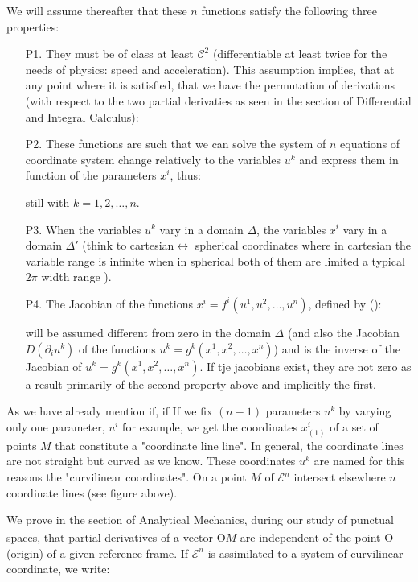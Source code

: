 	We will assume thereafter that these $n$ functions satisfy the following three properties:
	\begin{itemize}
		\item[P1.] They must be of class at least $\mathcal{C}^2$ (differentiable at least twice for the needs of physics: speed and acceleration). This assumption implies, that at any point where it is satisfied, that we have the permutation of derivations (with respect to the two partial derivaties as seen in the section of Differential and Integral Calculus):
		

		\item[P2.] These functions are such that we can solve the system of $n$ equations of coordinate system change relatively to the variables $u^k$ and express them in function of the parameters $x^i$, thus:
		
		still with $k=1,2, \ldots,n$.

		\item[P3.] When the variables $u^k$ vary in a domain $\Delta$, the variables $x^i$ vary in a domain $\Delta'$ (think to cartesian$\leftrightarrow$ spherical coordinates where in cartesian the variable range is infinite when in spherical both of them are limited a typical $2\pi$ width range ). 

		\item[P4.] The Jacobian of the functions $x^i=f^i(u^1,u^2,\ldots,u^n)$, defined by ():
		
		will be assumed different from zero in the domain $\Delta$ (and also the Jacobian $D(\partial_i u^k)$ of the functions $u^k=g^k(x^1,x^2,\ldots,x^n)$) and is the inverse of the Jacobian of $u^k=g^k(x^1,x^2,\ldots,x^n)$. If tje jacobians exist, they are not zero as a result primarily of the second property above and implicitly the first.
	\end{itemize}
	As we have already mention if, if If we fix $(n-1)$ parameters $u^k$ by varying only one parameter, $u^i$ for example, we get the coordinates $x_{(1)}^i$ of a set of points $M$ that constitute a "coordinate line line". In general, the coordinate lines are not straight but curved as we know. These coordinates $u^k$ are named for this reasons the "curvilinear coordinates". On a point $M$ of $\mathcal{E}^n$ intersect elsewhere $n$ coordinate lines (see figure above).
	
	We prove in the section of Analytical Mechanics, during our study of punctual spaces, that partial derivatives of a vector $\overrightarrow{\text{O}M}$ are independent of the point O (origin) of a given reference frame. If $\mathcal{E}^n$ is assimilated to a system of curvilinear coordinate, we write:
	
